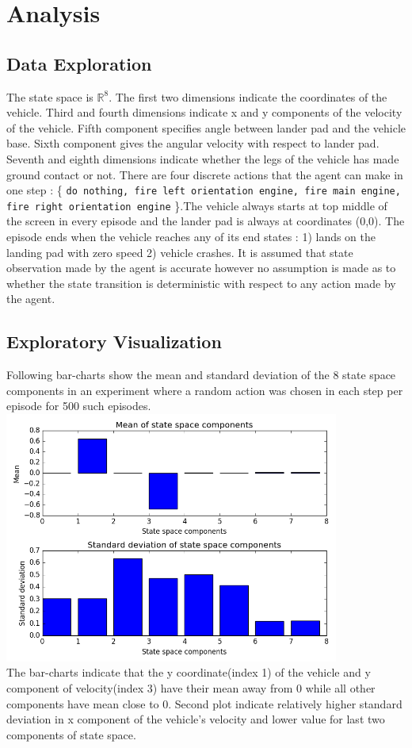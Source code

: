 \documentclass{article}
\begin{document}
\section{Analysis}
\subsection*{Data Exploration}
The state space is $\mathbb{R}^8$. The first two dimensions indicate the coordinates of the vehicle. Third and fourth dimensions indicate x and y components of the velocity of the vehicle. Fifth component specifies angle between lander pad and the vehicle base. Sixth component gives the angular velocity with respect to lander pad. Seventh and eighth dimensions indicate whether the legs of the vehicle has made ground contact or not. There are four discrete actions that the agent can make in one step : \{ \texttt{do nothing, fire left orientation engine, fire main engine, fire right orientation engine} \}.The vehicle always starts at top middle of the screen in every episode and the lander pad is always at coordinates (0,0). The episode ends when the vehicle reaches any of its end states : 1) lands on the landing pad with zero speed 2) vehicle crashes. It is assumed that state observation made by the agent is accurate however no assumption is made as to whether the state transition is deterministic with respect to any action made by the agent.
\subsection*{Exploratory Visualization}
Following bar-charts show the mean and standard deviation of the 8 state space components in an experiment where a random action was chosen in each step per episode for 500 such episodes.\\
\includegraphics[width=11cm]{img/state-space}\\
The bar-charts indicate that the y coordinate(index 1) of the vehicle and y component of velocity(index 3) have their mean away from 0 while all other components have mean close to 0. Second plot indicate relatively higher standard deviation in x component of the vehicle's velocity and lower value for last two components of state space.
\end{document}
